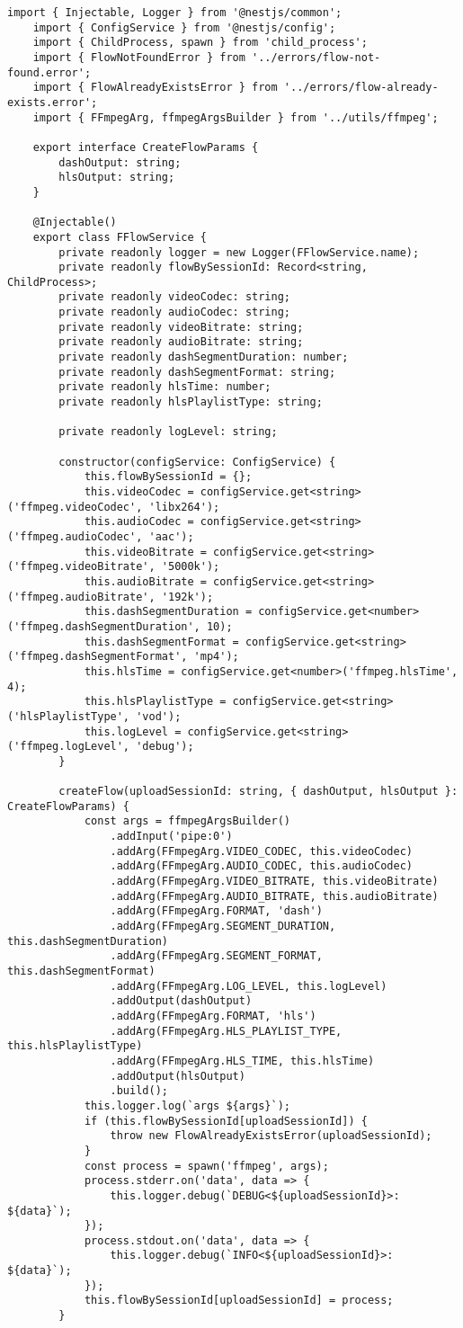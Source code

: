 \begin{lstlisting}[caption={fflow.service.ts}]
	import { Injectable, Logger } from '@nestjs/common';
	import { ConfigService } from '@nestjs/config';
	import { ChildProcess, spawn } from 'child_process';
	import { FlowNotFoundError } from '../errors/flow-not-found.error';
	import { FlowAlreadyExistsError } from '../errors/flow-already-exists.error';
	import { FFmpegArg, ffmpegArgsBuilder } from '../utils/ffmpeg';
	
	export interface CreateFlowParams {
		dashOutput: string;
		hlsOutput: string;
	}
	
	@Injectable()
	export class FFlowService {
		private readonly logger = new Logger(FFlowService.name);
		private readonly flowBySessionId: Record<string, ChildProcess>;
		private readonly videoCodec: string;
		private readonly audioCodec: string;
		private readonly videoBitrate: string;
		private readonly audioBitrate: string;
		private readonly dashSegmentDuration: number;
		private readonly dashSegmentFormat: string;
		private readonly hlsTime: number;
		private readonly hlsPlaylistType: string;
		
		private readonly logLevel: string;
		
		constructor(configService: ConfigService) {
			this.flowBySessionId = {};
			this.videoCodec = configService.get<string>('ffmpeg.videoCodec', 'libx264');
			this.audioCodec = configService.get<string>('ffmpeg.audioCodec', 'aac');
			this.videoBitrate = configService.get<string>('ffmpeg.videoBitrate', '5000k');
			this.audioBitrate = configService.get<string>('ffmpeg.audioBitrate', '192k');
			this.dashSegmentDuration = configService.get<number>('ffmpeg.dashSegmentDuration', 10);
			this.dashSegmentFormat = configService.get<string>('ffmpeg.dashSegmentFormat', 'mp4');
			this.hlsTime = configService.get<number>('ffmpeg.hlsTime', 4);
			this.hlsPlaylistType = configService.get<string>('hlsPlaylistType', 'vod');
			this.logLevel = configService.get<string>('ffmpeg.logLevel', 'debug');
		}
		
		createFlow(uploadSessionId: string, { dashOutput, hlsOutput }: CreateFlowParams) {
			const args = ffmpegArgsBuilder()
				.addInput('pipe:0')
				.addArg(FFmpegArg.VIDEO_CODEC, this.videoCodec)
				.addArg(FFmpegArg.AUDIO_CODEC, this.audioCodec)
				.addArg(FFmpegArg.VIDEO_BITRATE, this.videoBitrate)
				.addArg(FFmpegArg.AUDIO_BITRATE, this.audioBitrate)
				.addArg(FFmpegArg.FORMAT, 'dash')
				.addArg(FFmpegArg.SEGMENT_DURATION, this.dashSegmentDuration)
				.addArg(FFmpegArg.SEGMENT_FORMAT, this.dashSegmentFormat)
				.addArg(FFmpegArg.LOG_LEVEL, this.logLevel)
				.addOutput(dashOutput)
				.addArg(FFmpegArg.FORMAT, 'hls')
				.addArg(FFmpegArg.HLS_PLAYLIST_TYPE, this.hlsPlaylistType)
				.addArg(FFmpegArg.HLS_TIME, this.hlsTime)
				.addOutput(hlsOutput)
				.build();
			this.logger.log(`args ${args}`);
			if (this.flowBySessionId[uploadSessionId]) {
				throw new FlowAlreadyExistsError(uploadSessionId);
			}
			const process = spawn('ffmpeg', args);
			process.stderr.on('data', data => {
				this.logger.debug(`DEBUG<${uploadSessionId}>: ${data}`);
			});
			process.stdout.on('data', data => {
				this.logger.debug(`INFO<${uploadSessionId}>: ${data}`);
			});
			this.flowBySessionId[uploadSessionId] = process;
		}
		

\end{lstlisting}

